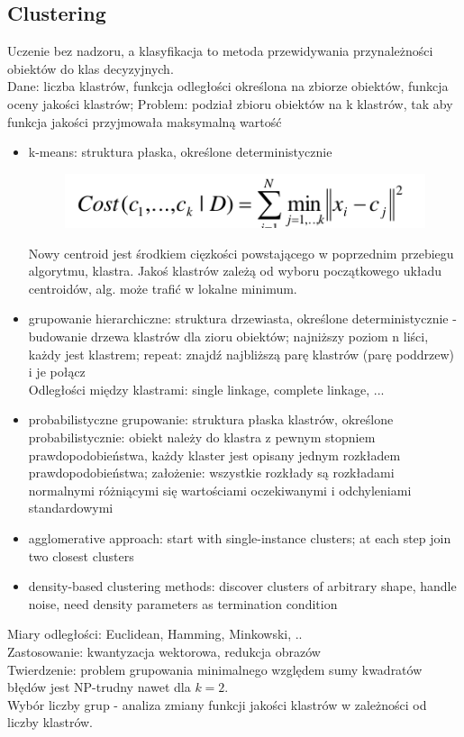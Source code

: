 \documentclass[10pt,a4paper]{article}
\begin{document}
\subsection{Clustering}
Uczenie bez nadzoru, a klasyfikacja to metoda przewidywania przynależności obiektów do klas decyzyjnych. \\
Dane: liczba klastrów, funkcja odległości określona na zbiorze obiektów, funkcja oceny jakości klastrów; Problem: podział zbioru obiektów na k klastrów, tak aby funkcja jakości przyjmowała maksymalną wartość
  \begin{itemize}
    \item k-means: struktura płaska, określone deterministycznie
    \begin{figure}[H]
      \centering
        \includegraphics[scale=0.50]{images/koszt.png}
    \end{figure}
    Nowy centroid jest środkiem cięzkości powstającego w poprzednim przebiegu algorytmu, klastra. Jakoś klastrów zależą od wyboru początkowego układu centroidów, alg. może trafić w lokalne minimum.
    \item grupowanie hierarchiczne: struktura drzewiasta, określone deterministycznie - budowanie drzewa klastrów dla zioru obiektów; najniższy poziom n liści, każdy jest klastrem; repeat: znajdź najbliższą parę klastrów (parę poddrzew) i je połącz \\
    Odległości między klastrami: single linkage, complete linkage, ...
    \item probabilistyczne grupowanie: struktura płaska klastrów, określone probabilistycznie: obiekt należy do klastra z pewnym stopniem prawdopodobieństwa, każdy klaster jest opisany jednym rozkładem prawdopodobieństwa; założenie: wszystkie rozkłady są rozkładami normalnymi różniącymi się wartościami oczekiwanymi i odchyleniami standardowymi
    \item agglomerative approach: start with single-instance clusters; at each step join two closest clusters
    \item density-based clustering methods: discover clusters of arbitrary shape, handle noise, need density parameters as termination condition
  \end{itemize}
  Miary odległości: Euclidean, Hamming, Minkowski, ..\\
  Zastosowanie: kwantyzacja wektorowa, redukcja obrazów \\
  Twierdzenie: problem grupowania minimalnego względem sumy kwadratów błędów jest NP-trudny nawet dla $k = 2$. \\
  Wybór liczby grup - analiza zmiany funkcji jakości klastrów w zależności od liczby klastrów. \\
\end{document}
